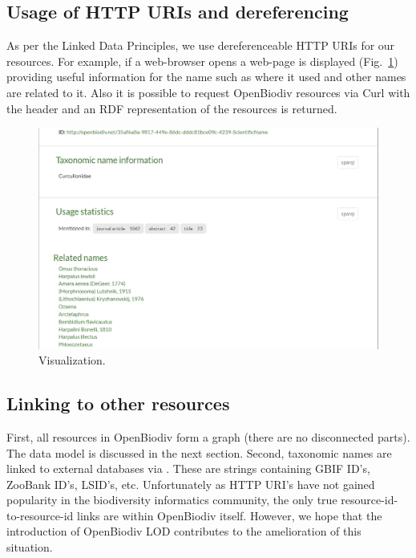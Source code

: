 \subsection{Usage of HTTP URIs and dereferencing}

As per the Linked Data Principles, we use dereferenceable HTTP URIs for our resources. For example, if a web-browser opens  a web-page is displayed (Fig.~\ref{fig:portal-name-visualization}) providing useful information for the name such as where it used and other names are related to it. Also it is possible to request OpenBiodiv resources via Curl with the header  and an RDF representation of the resources is returned.

\begin{figure}
\centering
\includegraphics[width=\textwidth]{Figures/portal-name-visualization}
\decoRule
\caption{Visualization.}
\label{fig:portal-name-visualization}
\end{figure}

\subsection{Linking to other resources}

First, all resources in OpenBiodiv form a graph (there are no disconnected parts). The data model is discussed in the next section. Second, taxonomic names are linked to external databases via . These are strings containing GBIF ID's, ZooBank ID's, LSID's, etc. Unfortunately as HTTP URI's have not gained popularity in the biodiversity informatics community, the only true resource-id-to-resource-id links are within OpenBiodiv itself. However, we hope that the introduction of OpenBiodiv LOD contributes to the amelioration of this situation.

